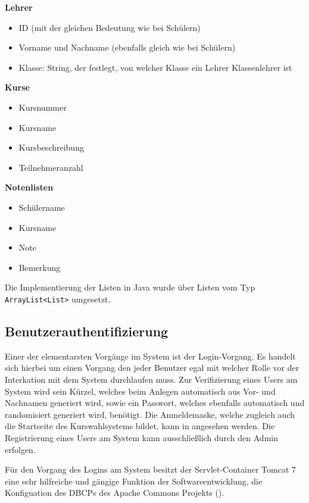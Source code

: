\textbf{Lehrer}
\begin{itemize}
  \item ID (mit der gleichen Bedeutung wie bei Schülern)
  \item Vorname und Nachname (ebenfalls gleich wie bei Schülern)
  \item Klasse: String, der festlegt, von welcher Klasse ein Lehrer Klassenlehrer ist
\end{itemize}

\textbf{Kurse}
\begin{itemize}
  \item Kursnummer
  \item Kursname
  \item Kursbeschreibung
  \item Teilnehmeranzahl
\end{itemize}

\textbf{Notenlisten}
\begin{itemize}
  \item Schülername
  \item Kursname
  \item Note
  \item Bemerkung
\end{itemize}

Die Implementierung der Listen in Java wurde über Listen vom Typ \texttt{ArrayList<List>} umgesetzt. 

\subsection{Benutzerauthentifizierung}

Einer der elementarsten Vorgänge im System ist der Login-Vorgang. Es handelt sich hierbei um einen Vorgang den jeder Benutzer egal mit welcher Rolle vor der Interkation mit dem System durchlaufen muss. Zur Verifizierung eines Users am System wird sein Kürzel, welches beim Anlegen automatisch aus Vor- und Nachnamen generiert wird, sowie ein Passwort, welches ebenfalls automatisch und randomisiert generiert wird, benötigt. Die Anmeldemaske, welche zugleich auch die Startseite des Kurswahlsystems bildet, kann in  angesehen werden. Die Registrierung eines Users am System kann ausschließlich durch den Admin erfolgen.

Für den Vorgang des Logins am System besitzt der Servlet-Container Tomcat 7 eine sehr hilfreiche und gängige Funktion der Softwareentwicklung, die Konfiguation des \ac{DBCP}s des Apache Commons Projekts (\cite{tomcatDBCP}). 

